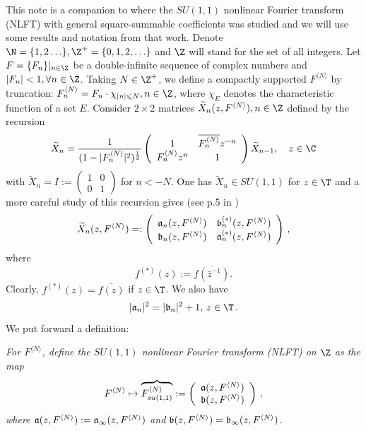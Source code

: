 \documentclass[twoside,a4paper]{amsart}
\def\le{\leqslant}
\theoremstyle{remark}
\numberwithin{equation}{section}
\begin{document}
This note is a companion to \cite{den26} where the $SU(1,1)$ nonlinear Fourier transform (NLFT) with general square-summable coefficients was studied and  we will  use some results and notation from that work. Denote $\N=\{1,2\ldots\}, \Z^+=\{0,1,2,\ldots\}$ and $\Z$ will stand for the set of all integers.
  Let $F=\{F_n\}|_{n\in \Z}$ be a double-infinite sequence of complex numbers and $|F_n|<1,\forall n\in \Z$. Taking $N\in \Z^+$, we define a compactly supported $F^{\langle N\rangle}$ by truncation: $F^{\langle N\rangle}_n=F_n\cdot \chi_{|n|\le N}, n\in \Z$, where $\chi_E$ denotes the characteristic function of a set $E$. Consider $2\times 2$ matrices $\widetilde X_n(z,F^{\langle N\rangle}), n\in \Z$ defined by the recursion
\begin{equation}\label{rec5}
\widetilde X_n= \frac{1}{(1-|F_n^{\langle N\rangle}|^2)^{\frac 12}}
\left(\begin{array}{cc}
1& \overline{F_n^{\langle N\rangle}}z^{-n}\\
F_n^{\langle N\rangle} z^n &1
\end{array}\right)\widetilde X_{n-1}, \quad z\in \C
\end{equation}
with $\widetilde X_n=I:=\left(\begin{smallmatrix}1&0\\0&1
\end{smallmatrix}
\right)$ for $n< -N$. One has $\widetilde X_n\in SU(1,1)$ for $z\in \T$ and a more careful study of this  recursion  gives (see p.5 in \cite{tt}) 
\[
\widetilde X_n(z,F^{\langle N\rangle})=:\left(\begin{array}{cc}
\frak{a}_n(z,F^{\langle N\rangle})& \frak{b}^{(*)}_n(z,F^{\langle N\rangle})\\
\frak{b}_n(z,F^{\langle N\rangle}) &\frak{a}^{(*)}_n(z,F^{\langle N\rangle})
\end{array}\right)\,,
\]
where \begin{equation}\label{oper1}
f^{(*)}(z):=\overline{f(\bar{z}^{-1})}.
\end{equation} 
Clearly, $f^{(*)}(z)=\overline{f(z)}$ if $z\in \T$. We also have
\begin{equation}\label{susu}
|\frak{a}_n|^2=|\frak{b}_n|^2+1, \, z\in \T\,.
\end{equation}
We put forward a definition: \smallskip

 {\it For $F^{\langle N\rangle}$, define the $SU(1,1)$ nonlinear Fourier transform (NLFT) on $\Z$ as the map 
\[
F^{\langle N\rangle}\mapsto \overbrace{F_{su(1,1)}^{\langle N\rangle}}:=\left(\begin{array}{c}
\frak{a}(z,F^{\langle N\rangle})\\
\frak{b}(z,F^{\langle N\rangle}) 
\end{array}\right)\,,
\]
where $\frak{a}(z,F^{\langle N\rangle}):=\frak{a}_\infty(z,F^{\langle N\rangle})$ and 
$\frak{b}(z,F^{\langle N\rangle})=\frak{b}_\infty(z,F^{\langle N\rangle})$.}
\smallskip
\end{document}
